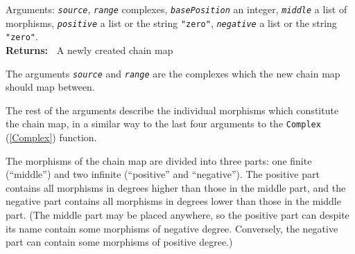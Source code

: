 \documentclass[a4paper,11pt]{report}
\begin{document}
{{{ Arguments: \mbox{\texttt{\mdseries\slshape source}}, \mbox{\texttt{\mdseries\slshape range}} \texttt{}\texttt{} complexes, \mbox{\texttt{\mdseries\slshape basePosition}} \texttt{}\texttt{} an integer, \mbox{\texttt{\mdseries\slshape middle}} \texttt{}\texttt{} a list of morphisms, \mbox{\texttt{\mdseries\slshape positive}} \texttt{}\texttt{} a list or the string \texttt{"zero"}, \mbox{\texttt{\mdseries\slshape negative}} \texttt{}\texttt{} a list or the string \texttt{"zero"}. \\
 \textbf{\indent Returns:\ }
A newly created chain map



 The arguments \mbox{\texttt{\mdseries\slshape source}} and \mbox{\texttt{\mdseries\slshape range}} are the complexes which the new chain map should map between.

 The rest of the arguments describe the individual morphisms which constitute
the chain map, in a similar way to the last four arguments to the \texttt{Complex} (\ref{Complex}) function.

 The morphisms of the chain map are divided into three parts: one finite (``middle'') and two infinite (``positive'' and ``negative''). The positive part contains all morphisms in degrees higher than those in
the middle part, and the negative part contains all morphisms in degrees lower
than those in the middle part. (The middle part may be placed anywhere, so the
positive part can \texttt{}\texttt{} despite its name
\texttt{}\texttt{} contain some morphisms of negative
degree. Conversely, the negative part can contain some morphisms of positive
degree.)

}}}
\end{document}
